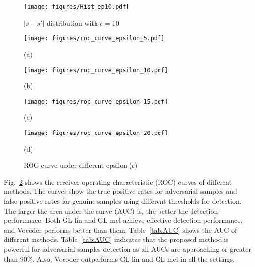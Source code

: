 \begin{figure}[t]
\centering
\texttt{[image: figures/Hist\_ep10.pdf]}
\caption{$|s-s'|$ distribution with $\epsilon=10$}
\label{fig:Hist-ep5}
\end{figure}

\begin{figure}[h]
    \centering
    \begin{minipage}[h]{0.23\textwidth}
        \centering
        \texttt{[image: figures/roc\_curve\_epsilon\_5.pdf]}
        {\par \footnotesize (a)\par}
    \end{minipage}
    \hfill
    \begin{minipage}[h]{0.23\textwidth}
        \centering
        \texttt{[image: figures/roc\_curve\_epsilon\_10.pdf]}
        {\par \footnotesize (b)\par}
    \end{minipage}
    \hfill
    \begin{minipage}[h]{0.23\textwidth}
        \centering
        \texttt{[image: figures/roc\_curve\_epsilon\_15.pdf]}
        {\par \footnotesize (c)\par}
    \end{minipage}
    \hfill
    \begin{minipage}[h]{0.23\textwidth}
        \centering
        \texttt{[image: figures/roc\_curve\_epsilon\_20.pdf]}
        {\par \footnotesize (d)\par}
    \end{minipage}
    \vspace{-5pt}
    \caption{ROC curve under different epsilon ($\epsilon$) }
    \label{fig:roc-curve-epsilon=5}
    \vspace{5pt}
\end{figure}


Fig.~\ref{fig:roc-curve-epsilon=5} shows the receiver operating characteristic (ROC) curves of different methods.
The curves show the true positive rates for adversarial samples and false positive rates for genuine samples using different thresholds for detection.
The larger the area under the curve (AUC) is, the better the detection performance.
Both GL-lin and GL-mel achieve effective detection performance, and Vocoder performs better than them.
Table~\ref{tab:AUC} shows the AUC of different methods. 
Table~\ref{tab:AUC} indicates that the proposed method is powerful for adversarial samples detection as all AUCs are approaching or greater than 90\%.
Also, Vocoder outperforms GL-lin and GL-mel in all the settings.

